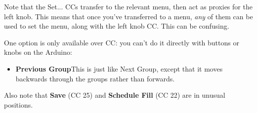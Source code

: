 \documentclass{article}
\begin{document}
Note that the Set... CCs transfer to the relevant menu, then act as proxies for the left knob.  This means that once you've transferred to a menu, {\it any} of them can be used to set the menu, along with the left knob CC.  This can be confusing.

One option is only available over CC: you can't do it directly with buttons or knobs on the Arduino:

\begin{itemize}
\item {\bf Previous Group}\quad This is just like Next Group, except that it moves backwards through the groups rather than forwards.
\end{itemize}

Also note that {\bf Save} (CC 25) and {\bf Schedule Fill} (CC 22) are in unusual positions.
\end{document}
